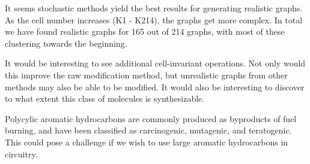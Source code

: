 \documentclass[12pt]{article}
\begin{document}
It seems stochastic methods yield the best results for generating realistic graphs. As the cell number increases (K1 - K214), the graphs get more complex. In total we have found realistic graphs for 165 out of 214 graphs, with most of these clustering towards the beginning.

It would be interesting to see additional cell-invariant operations. Not only would this improve the raw modification method, but unrealistic graphs from other methods may also be able to be modified. It would also be interesting to discover to what extent this class of molecules is synthesizable. 

Polycylic aromatic hydrocarbons are commonly produced as byproducts of fuel burning, and have been classified as carcinogenic, mutagenic, and teratogenic. This could pose a challenge if we wish to use large aromatic hydrocarbons in circuitry. 
\end{document}
